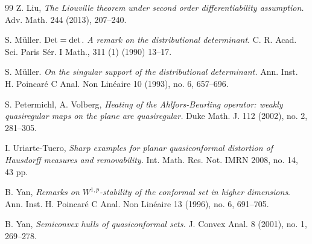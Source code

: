 \documentclass[reqno,11pt]{amsart}
\numberwithin{equation}{section}
\theoremstyle{remark}
\begin{document}
\begin{thebibliography}{99}
Z. Liu, \emph{The Liouville theorem under second order differentiability assumption.}
Adv. Math. 244 (2013), 207--240.

S. M\"uller. \emph{ $\rm Det =  det$. A remark on the distributional determinant}. C. R. Acad. Sci. Paris S\'er. I
Math., 311 (1) (1990) 13--17. 

S. M\"uller. \emph{
On the singular support of the distributional determinant.}
Ann. Inst. H. Poincar\'e C Anal. Non Lin\'eaire 10 (1993), no. 6, 657--696.


S. Petermichl, A. Volberg, 
\emph{Heating of the Ahlfors-Beurling operator: weakly quasiregular maps on the plane are quasiregular.}
Duke Math. J. 112 (2002), no. 2, 281--305.

I. Uriarte-Tuero, 
\emph{Sharp examples for planar quasiconformal distortion of Hausdorff measures and removability.}
Int. Math. Res. Not. IMRN 2008, no. 14, 43 pp. 

B. Yan, \emph{Remarks on $W^{1,p}$-stability of the conformal set in higher dimensions}. Ann. Inst. H. Poincar\'e C Anal. Non Lin\'eaire 13 (1996), no. 6, 691--705.

B. Yan, \emph{Semiconvex hulls of quasiconformal sets.}
J. Convex Anal. 8 (2001), no. 1, 269--278.

\end{thebibliography}
\end{document}
